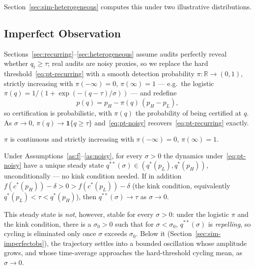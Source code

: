 Section~\ref{sec:sim-heterogeneous} computes this under two illustrative distributions.

\subsection{Imperfect Observation}
\label{sec:imperfectobs}

Sections~\ref{sec:recurring}--\ref{sec:heterogeneous} assume audits perfectly reveal whether $q_t \geq \tau$; real audits are noisy proxies, so we replace the hard threshold~\eqref{eq:pt-recurring} with a smooth detection probability $\pi: \mathbb{R} \to (0,1)$, strictly increasing with $\pi(-\infty)=0$, $\pi(\infty)=1$ — e.g.\ the logistic $\pi(q) = 1/(1+\exp(-(q-\tau)/\sigma))$ — and redefine
\begin{equation}
p(q) = p_H - \pi(q)\,(p_H - p_L),
\label{eq:pt-noisy}
\end{equation}
so certification is probabilistic, with $\pi(q)$ the probability of being certified at $q$. As $\sigma \to 0$, $\pi(q) \to \mathbf{1}\{q \geq \tau\}$ and~\eqref{eq:pt-noisy} recovers~\eqref{eq:pt-recurring} exactly.

\begin{assumption}
$\pi$ is continuous and strictly increasing with $\pi(-\infty)=0$, $\pi(\infty)=1$.
\label{as:noisy}
\end{assumption}

\begin{proposition}
Under Assumptions~\ref{as:f}--\ref{as:noisy}, for every $\sigma > 0$ the dynamics under~\eqref{eq:pt-noisy} have a unique steady state $q^{**}(\sigma) \in (q^*(p_L), q^*(p_H))$, unconditionally — no kink condition needed. If in addition $f(c^*(p_H)) - \delta > 0 > f(c^*(p_L)) - \delta$ (the kink condition, equivalently $q^*(p_L)<\tau<q^*(p_H)$), then $q^{**}(\sigma) \to \tau$ as $\sigma \to 0$.

This steady state is \emph{not}, however, stable for every $\sigma>0$: under the logistic $\pi$ and the kink condition, there is a $\sigma_0>0$ such that for $\sigma<\sigma_0$, $q^{**}(\sigma)$ is \emph{repelling}, so cycling is eliminated only once $\sigma$ exceeds $\sigma_0$. Below it (Section~\ref{sec:sim-imperfectobs}), the trajectory settles into a bounded oscillation whose amplitude grows, and whose time-average approaches the hard-threshold cycling mean, as $\sigma\to0$.
\label{prop:imperfectobs}
\end{proposition}

